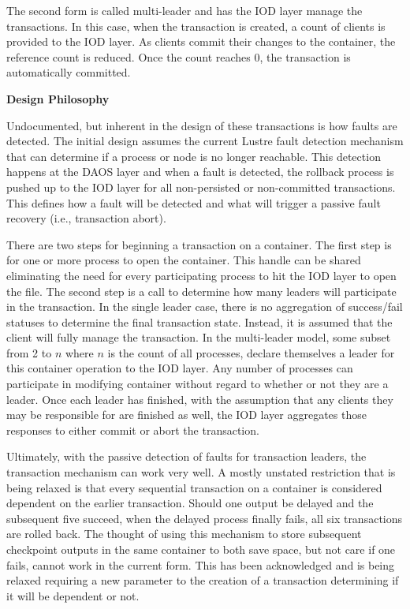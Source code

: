 \documentclass[conference]{IEEEtran}
\begin{document}
The second form is called multi-leader and has the IOD layer manage the
transactions. In this case, when the transaction is created, a count of clients
is provided to the IOD layer. As clients commit their changes to the container,
the reference count is reduced. Once the count reaches 0, the transaction is
automatically committed.

\noindent\textbf{Design Philosophy}

Undocumented, but inherent in the design of these transactions is how faults
are detected. The initial design assumes the current Lustre fault detection
mechanism that can determine if a process or node is no longer reachable. This
detection happens at the DAOS layer and when a fault is detected, the rollback
process is pushed up to the IOD layer for all non-persisted or non-committed
transactions. This defines how a fault will be detected and what will trigger a
passive fault recovery (i.e., transaction abort).

There are two steps for beginning a transaction on a container. The first step
is for one or more process to open the container. This handle can be shared
eliminating the need for every participating process to hit the IOD layer to
open the file. The second step is a call to determine how many leaders will
participate in the transaction. In the single leader case, there is no
aggregation of success/fail statuses to determine the final transaction state.
Instead, it is assumed that the client will fully manage the transaction. In
the multi-leader model, some subset from 2 to $n$ where $n$ is the count of all
processes, declare themselves a leader for this container operation to the IOD
layer. Any number of processes can participate in modifying container without
regard to whether or not they are a leader. Once each leader has finished, with
the assumption that any clients they may be responsible for are finished as
well, the IOD layer aggregates those responses to either commit or abort the
transaction.

Ultimately, with the passive detection of faults for transaction leaders, the
transaction mechanism can work very well. A mostly unstated restriction that is
being relaxed is that every sequential transaction on a container is considered
dependent on the earlier transaction. Should one output be delayed and the
subsequent five succeed, when the delayed process finally fails, all six
transactions are rolled back. The thought of using this mechanism to store
subsequent checkpoint outputs in the same container to both save space, but not
care if one fails, cannot work in the current form. This has been acknowledged
and is being relaxed requiring a new parameter to the creation of a transaction
determining if it will be dependent or not.
\end{document}
